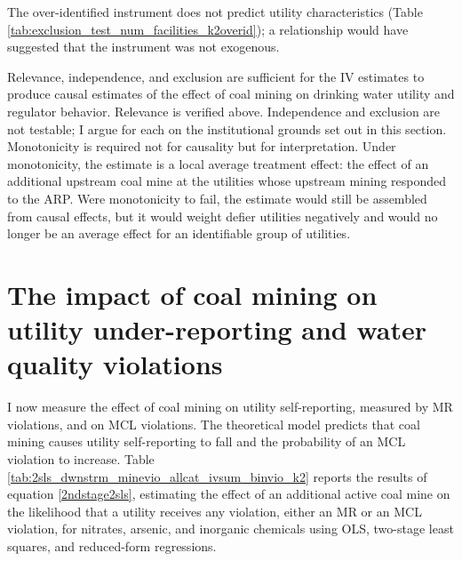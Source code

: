 \documentclass[12pt]{article}
\begin{document}
The over-identified instrument does not predict utility characteristics (Table \ref{tab:exclusion_test_num_facilities_k2overid}); a relationship would have suggested that the instrument was not exogenous.

Relevance, independence, and exclusion are sufficient for the IV estimates to produce causal estimates of the effect of coal mining on drinking water utility and regulator behavior. Relevance is verified above. Independence and exclusion are not testable; I argue for each on the institutional grounds set out in this section. Monotonicity is required not for causality but for interpretation. Under monotonicity, the estimate is a local average treatment effect: the effect of an additional upstream coal mine at the utilities whose upstream mining responded to the ARP. Were monotonicity to fail, the estimate would still be assembled from causal effects, but it would weight defier utilities negatively and would no longer be an average effect for an identifiable group of utilities.

\section{The impact of coal mining on utility under-reporting and water quality violations}\label{sec:violations}

I now measure the effect of coal mining on utility self-reporting, measured by MR violations, and on MCL violations. The theoretical model predicts that coal mining causes utility self-reporting to fall and the probability of an MCL violation to increase. Table \ref{tab:2sls_dwnstrm_minevio_allcat_ivsum_binvio_k2} reports the results of equation \ref{2ndstage2sls}, estimating the effect of an additional active coal mine on the likelihood that a utility receives any violation, either an MR or an MCL violation, for nitrates, arsenic, and inorganic chemicals using OLS, two-stage least squares, and reduced-form regressions.

\end{document}
